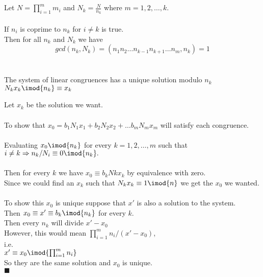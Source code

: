 \documentclass{article}
\begin{document}
    \bigskip
    
    \textbf{\pf}
    \\ \\
    Let $N = \prod_{i=1}^{m} m_{i}$ and $N_{k} = \frac{N}{n_{k}}$ where $m = {1,2, \ldots, k}$.
    \\ \\
    If $n_{i}$ is coprime to $n_{k}$ for $i \neq k$ is true.
    \\
    Then for all $n_{k}$ and $N_{k}$ we have 
    $$gcd( n_{k},N_{k}) = (n_{1}n_{2} \ldots n_{k-1}n_{k+1} \ldots n_{m},n_{k})=1$$
    \\ \\
    The system of linear congruences has a unique solution modulo $n_{k}$
    \\
    $N_{k}x_{k}\imod{n_{k}} \equiv x_{k}$
    \bigskip
    
    \pagebreak
    
    Let $x_{k}$ be the solution we want.
    \\ \\
    To show that $x_{0} = b_{1}N_{1}x_{1} + b_{2}N_{2}x_{2} + \ldots b_{m}N_{m}x_{m}$ will satisfy each congruence.
    \\ \\
    Evaluating $x_{0} \imod{n_{k}}$ for every $k = {1,2, \ldots, m}$ such that $i \neq k \Rightarrow n_{k}/N_{i} \equiv 0 \imod{n_{k}}.$
    \\ \\
    Then for every $k$ we have $x_{0} \equiv b_{k}N{k}x_{k}$ by equivalence with zero.
    \\
    Since we could find an $x_{k}$ such that $N_{k}x_{k} \equiv 1\imod{n}$ we get the $x_{0}$ we wanted. 
    \\ \\
    To show this $x_{0}$ is unique suppose that $x'$ is also a solution to the system. \\
    Then $x_{0} \equiv x' \equiv b_{k}\imod{n_{k}}$ for every $k$.
    \\
    Then every $n_k$ will divide $x' - x_{0}$
    \\
    However, this would mean $\prod_{i=1}^{m} n_{i}/(x'-x_{0})$,
    \\
    i.e. 
    \\
    $x' \equiv x_{0} \imod{\prod_{i=1}^{m} n_{i}}$
    \\ 
    So they are the same solution and $x_{0}$ is unique.
    \\ 
    $\blacksquare$
\end{document}

